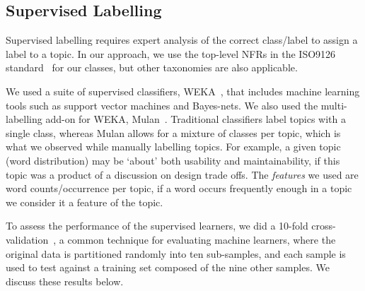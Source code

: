 \documentclass[smallextended]{svjour3}       %
\begin{document}
\subsection{Supervised Labelling}
\label{sec:suplabelling}
Supervised labelling requires expert analysis of the correct
class/label to assign a label to a topic. In our approach, we use the top-level NFRs in the ISO9126 standard~\cite{iso9126} for our classes, but other
taxonomies are also applicable.%

We used a suite of supervised classifiers, WEKA~\cite{weka09},
that includes machine learning tools such as support vector machines and Bayes-nets. 
We also used the multi-labelling add-on for WEKA, Mulan~\cite{mulan}. %
Traditional classifiers label topics with a single class, whereas Mulan allows for a mixture of classes per topic, which is what we observed while
manually labelling topics. For example, a given topic (word distribution) may be `about' both usability and maintainability, if this topic was a product of a discussion on design trade offs.
The \emph{features} we used are word counts/occurrence	per topic, if
a word occurs frequently enough in a topic we consider it a feature of
the topic.

To assess the performance of the supervised learners, we did a 10-fold cross-validation~\cite{Kohavi1995}, a common technique for evaluating machine
learners, where the original data is partitioned randomly into ten sub-samples, and each sample is used to test against a training set composed of the nine other samples.
We discuss these results below.%
\end{document}
